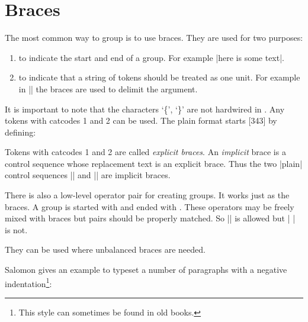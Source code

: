 \section{Braces}

The most common way to group is to use braces. They are used for two purposes:

\begin{enumerate}
\item to indicate the start and end of a group. For example |{\small here is some text}|.

\item to indicate that a string of tokens should be treated as one unit. For example in |\def\abc{...}| the braces are used
to delimit the argument.
\end{enumerate}

It is important to note that the characters `\{', `\}' are not hardwired in \tex. Any tokens with catcodes 1 and 2 can be used.
The plain format starts [343] by defining:

\begin{teX}
\catcode`\{ =1
\catcode `} = 2
\end{teX}

Tokens with catcodes 1 and 2 are called \emph{explicit braces}. An \emph{implicit} brace is a control sequence whose replacement text is an explicit brace. Thus the two |plain| control sequences 
|\bgroup| and |\egroup| are implicit braces. 

There is also a low-level \tex operator pair for creating groups. It works
just as the braces. A group is started with  and ended with
. These operators may be freely mixed with braces but pairs
should be properly matched. So |{ \begingroup \endgroup }| is allowed
but |{ \begingroup } \endgroup| is not.


They can be used where unbalanced braces are needed.

Salomon gives an example to typeset a number of paragraphs with a negative indentation\footnote{This style can sometimes be found in old books.}:

\begin{teX}
\def\negIndent{\brgoup\parindent=-20pt}
\def\endIndent{\par\egroup}

\negIndent
  \small\lipsum[1]
\endIndent
\end{teX}

